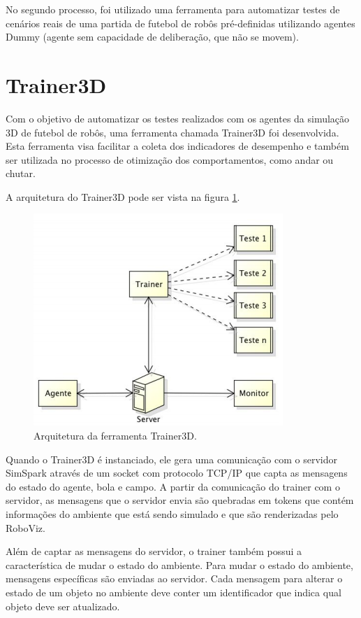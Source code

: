 No segundo processo, foi utilizado uma ferramenta para automatizar testes de cenários reais de uma partida de futebol de robôs
pré-definidas utilizando agentes Dummy (agente sem capacidade de deliberação, que não se movem).

\section{Trainer3D}
Com o objetivo de automatizar os testes realizados com os agentes da simulação 3D de futebol de robôs, uma ferramenta chamada 
Trainer3D foi desenvolvida. Esta ferramenta visa facilitar a coleta dos indicadores de desempenho e também ser utilizada no processo 
de otimização dos comportamentos, como andar ou chutar.

A arquitetura do Trainer3D pode ser vista na figura \ref{fig:trainer3d}.

\begin{figure}[!htb]
\centering
{}
\includegraphics[scale=0.8]{figuras/trainer3d.png}
\caption{Arquitetura da ferramenta Trainer3D.} 
\label{fig:trainer3d}
\end{figure}
\FloatBarrier

Quando o Trainer3D é instanciado, ele gera uma comunicação com o servidor SimSpark através de um socket com protocolo TCP/IP que capta as 
mensagens do estado do agente, bola e campo. A partir da comunicação do trainer com o servidor, as mensagens que o servidor envia são 
quebradas em tokens que contém informações do ambiente que está sendo simulado e que são renderizadas pelo RoboViz.

Além de captar as mensagens do servidor, o trainer também possui a característica de mudar o estado do ambiente. Para mudar o estado do ambiente, 
mensagens específicas são enviadas ao servidor. Cada mensagem para alterar o estado de um objeto no ambiente deve conter um identificador que 
indica qual objeto deve ser atualizado.


